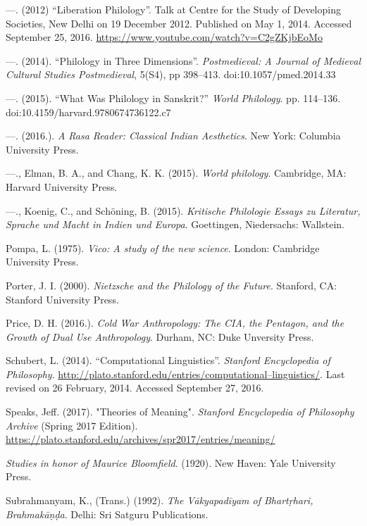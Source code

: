 \begin{thebibliography}{99}
  —. (2012) “Liberation Philology”. Talk at Centre for the Study of Developing Societies, New Delhi on 19 December 2012. Published on May 1, 2014. Accessed September 25, 2016. \url{https://www.youtube.com/watch?v=C2gZKjbEoMo}

  —. (2014). “Philology in Three Dimensions”. \textit{Postmedieval: A Journal of Medieval Cultural Studies Postmedieval}, 5(S4), pp 398–413. doi:10.1057/pmed.2014.33

  —. (2015). “What Was Philology in Sanskrit?” \textit{World Philology}. pp. 114–136. doi:10.4159/harvard.9780674736122.c7

  —. (2016.). \textit{A Rasa Reader: Classical Indian Aesthetics}. New York: Columbia University Press.

  —., Elman, B. A., and Chang, K. K. (2015). \textit{World philology}. Cambridge, MA: Harvard University Press.

  —., Koenig, C., and Schöning, B. (2015). \textit{Kritische Philologie Essays zu Literatur, Sprache und Macht in Indien und Europa}. Goettingen, Niedersachs: Wallstein.

  Pompa, L. (1975). \textit{Vico: A study of the new science}. London: Cambridge University Press.

  Porter, J. I. (2000). \textit{Nietzsche and the Philology of the Future}. Stanford, CA: Stanford University Press.

  Price, D. H. (2016.). \textit{Cold War Anthropology: The CIA, the Pentagon, and the Growth of Dual Use Anthropology}. Durham, NC: Duke Unversity Press.

  Schubert, L. (2014). “Computational Linguistics”. \textit{Stanford Encyclopedia of Philosophy}. \url{http://plato.stanford.edu/entries/computational–linguistics/}. Last revised on 26 February, 2014. Accessed September 27, 2016.

  Speaks, Jeff. (2017). "Theories of Meaning". \textit{Stanford Encyclopedia of Philosophy Archive} (Spring 2017 Edition). \url{https://plato.stanford.edu/archives/spr2017/entries/meaning/}

  \textit{Studies in honor of Maurice Bloomfield}. (1920). New Haven: Yale University Press.

  Subrahmanyam, K., (Trans.) (1992). \textit{The Vākyapadīyam of Bhartṛhari, Brahmakāṇḍa}. Delhi: Sri Satguru Publications.


\end{thebibliography}
